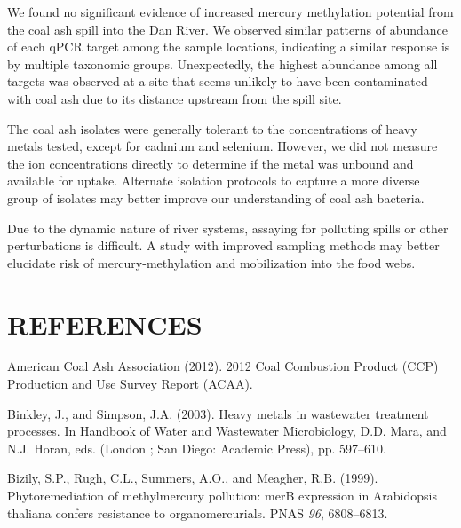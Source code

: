 \documentclass[ms, hidelinks]{uncgdissertationexp}
\theoremstyle{plain}
\theoremstyle{definition}
\theoremstyle{remark}
\begin{document}
We found no significant evidence of increased mercury methylation potential from the coal ash spill into the Dan River. We observed similar patterns of abundance of each qPCR target among the sample locations, indicating a similar response is by multiple taxonomic groups. Unexpectedly, the highest abundance among all targets was observed at a site that seems unlikely to have been contaminated with coal ash due to its distance upstream from the spill site.

The coal ash isolates were generally tolerant to the concentrations of heavy metals tested, except for cadmium and selenium. However, we did not measure the ion concentrations directly to determine if the metal was unbound and available for uptake. Alternate isolation protocols to capture a more diverse group of isolates may better improve our understanding of coal ash bacteria. 

Due to the dynamic nature of river systems, assaying for polluting spills or other perturbations is difficult. A study with  improved sampling methods may better elucidate risk of mercury-methylation and mobilization into the food webs.

\backmatter

\hypertarget{references}{%
\chapter{REFERENCES}\label{references}}

\noindent

\setlength{\parindent}{-0.20in}
\setlength{\leftskip}{0.20in}
\setlength{\parskip}{8pt}

\hypertarget{refs}{}
\leavevmode\hypertarget{ref-americancoalashassociation2012CoalCombustion2012}{}%
American Coal Ash Association (2012). 2012 Coal Combustion Product (CCP) Production and Use Survey Report (ACAA).

\leavevmode\hypertarget{ref-binkleyHeavyMetalsWastewater2003}{}%
Binkley, J., and Simpson, J.A. (2003). Heavy metals in wastewater treatment processes. In Handbook of Water and Wastewater Microbiology, D.D. Mara, and N.J. Horan, eds. (London ; San Diego: Academic Press), pp. 597--610.

\leavevmode\hypertarget{ref-bizilyPhytoremediationMethylmercuryPollution1999}{}%
Bizily, S.P., Rugh, C.L., Summers, A.O., and Meagher, R.B. (1999). Phytoremediation of methylmercury pollution: merB expression in Arabidopsis thaliana confers resistance to organomercurials. PNAS \emph{96}, 6808--6813.
\end{document}

